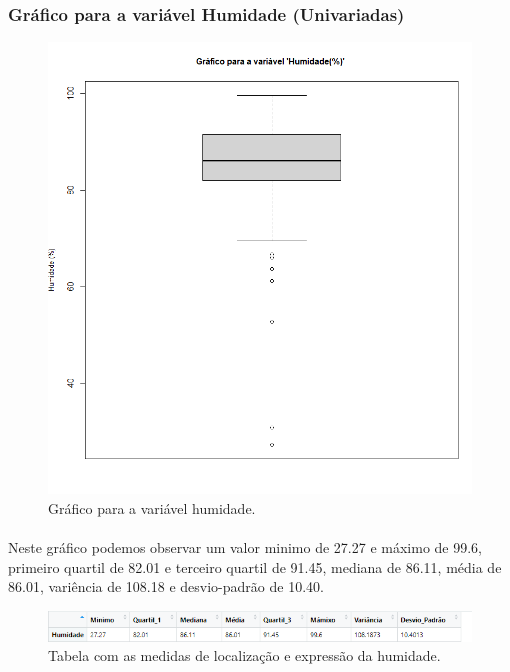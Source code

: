 \documentclass{article}
\begin{document}
\paragraph{}

\subsubsection{Gráfico para a variável Humidade (Univariadas)}
\begin{figure}[h]
       \centering %
        \includegraphics[scale=0.6]{grafico humidade.png}
       \caption{Gráfico para a variável humidade.}
       \label{fig:logo}
    \end{figure}
    
\paragraph{} Neste gráfico podemos observar um valor minimo de 27.27 e máximo de 99.6, primeiro quartil de 82.01 e terceiro quartil de 91.45, mediana de 86.11, média de 86.01, variência de 108.18 e desvio-padrão de 10.40.

\begin{figure}[h]
       \centering %
        \includegraphics[scale=0.8]{tabela_humidade.png}
       \caption{Tabela com as medidas de localização e expressão da humidade.}
       \label{fig:logo}
    \end{figure}
    
\end{document}
